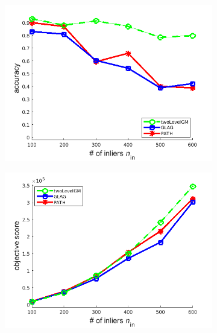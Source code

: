 \begin{figure}[h] 
		\begin{subfigure}[b]{0.33\textwidth}
			\centering
			\includegraphics[scale=0.25]{"chapter3/fig/SyntheticTest_BigGraphs/descr/Results_v4.3.3/Test2/accuracy_avg1t"} 
		\end{subfigure}
		\begin{subfigure}[b]{0.33\textwidth}
			\centering
			\includegraphics[scale=0.25]{"chapter3/fig/SyntheticTest_BigGraphs/descr/Results_v4.3.3/Test2/score_avg1t"} 
		\end{subfigure} 
		\begin{subfigure}[b]{0.32\textwidth}
			\centering

\end{subfigure}
\end{figure}
